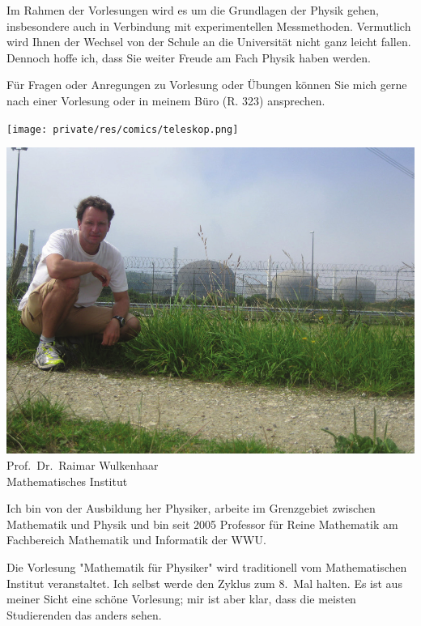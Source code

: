 \begin{multicols}{2}
Im Rahmen der Vorlesungen wird es um die Grundlagen der Physik gehen, insbesondere auch in Verbindung mit experimentellen Messmethoden. Vermutlich wird Ihnen der Wechsel von der Schule an die Universität nicht ganz leicht fallen. Dennoch hoffe ich, dass Sie weiter Freude am Fach Physik haben werden.   

Für Fragen oder Anregungen zu Vorlesung oder Übungen können Sie mich gerne nach einer Vorlesung oder in meinem Büro (R. 323) ansprechen.

\begin{center}
\texttt{[image: private/res/comics/teleskop.png]}
\end{center}
\end{multicols}

\newpage

\begin{multicols}{2}
\begin{center}
\includegraphics[width=0.9\columnwidth]{res/vorstellungsfotos/wulkenhaar.png}\\
Prof.\ Dr.\ Raimar Wulkenhaar\\
Mathematisches Institut
\end{center}

Ich bin von der Ausbildung her Physiker, arbeite im Grenzgebiet zwischen Mathematik und Physik und bin seit 2005 Professor für Reine Mathematik am Fachbereich Mathematik und Informatik der WWU.

Die Vorlesung "Mathematik für Physiker" wird traditionell vom Mathematischen Institut veranstaltet. Ich selbst werde den Zyklus zum 8.~Mal halten. Es ist aus meiner Sicht eine schöne Vorlesung; mir ist aber klar, dass die meisten Studierenden das anders sehen.


\end{multicols}
